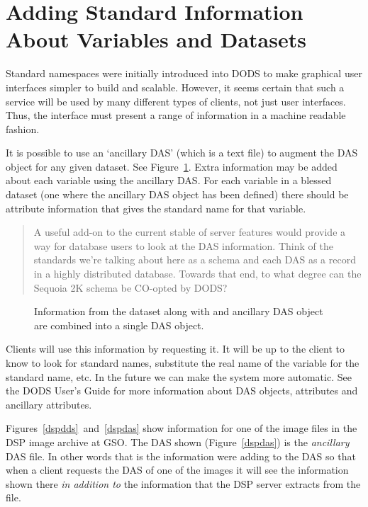 \documentclass[12pt]{article}
\begin{document}
\section{Adding Standard Information About Variables and Datasets}
\label{sec:standard}

Standard namespaces were initially introduced into DODS to make graphical
user interfaces simpler to build and scalable. However, it seems certain that
such a service will be used by many different types of clients, not just user
interfaces. Thus, the interface must present a range of information in a
machine readable fashion.

It is possible to use an `ancillary DAS' (which is a text file) to augment
the DAS object for any given dataset. See Figure~\ref{fig:ancillary}. Extra
information may be added about each variable using the ancillary DAS. For
each variable in a blessed dataset (one where the ancillary DAS object has
been defined) there should be attribute information that gives the standard
name for that variable.

\begin{quote}
  A useful add-on to the current stable of server features would provide a
  way for database users to look at the DAS information. Think of the
  standards we're talking about here as a schema and each DAS as a record in
  a highly distributed database. Towards that end, to what degree can the
  Sequoia 2K schema be CO-opted by DODS?
\end{quote}

\begin{figure}
\caption{Information from the dataset along with and ancillary DAS object are
  combined into a single DAS object.}
\label{fig:ancillary}
\end{figure}

Clients will use this information by requesting it. It will be up to the
client to know to look for standard names, substitute the real name of the
variable for the standard name, etc. In the future we can make the system
more automatic. See the DODS User's Guide for more information about DAS
objects, attributes and ancillary attributes.

Figures~\ref{dspdds}~and~\ref{dspdas} show information for one of the image
files in the DSP image archive at GSO. The DAS shown (Figure~\ref{dspdas}) is
the \emph{ancillary} DAS file. In other words that is the information were
adding to the DAS so that when a client requests the DAS of one of the images
it will see the information shown there \emph{in addition to} the information
that the DSP server extracts from the file.
\end{document}
